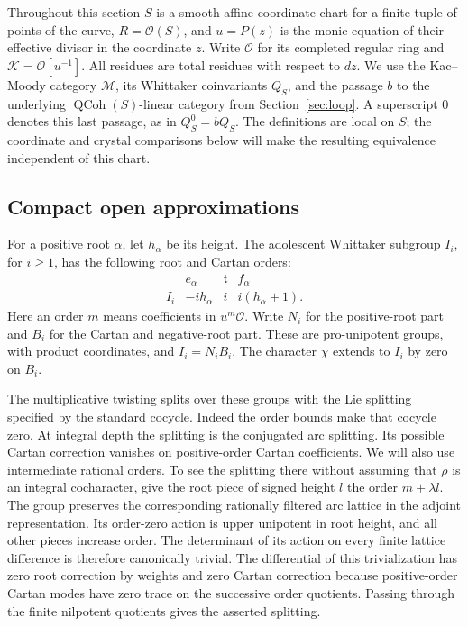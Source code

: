 \documentclass[11pt]{article}
\numberwithin{equation}{section}
\theoremstyle{definition}
\theoremstyle{remark}
\begin{document}
Throughout this section \(S\) is a smooth affine coordinate chart for a
finite tuple of points of the curve, \(R=\mathcal O(S)\), and \(u=P(z)\)
is the monic equation of their effective divisor in the coordinate
\(z\).  Write \(\mathcal O\) for its completed regular ring and
\(\mathcal K=\mathcal O[u^{-1}]\).  All residues are total residues with
respect to \(dz\).  We use the Kac--Moody category \(\mathcal M\), its
Whittaker coinvariants \(Q_S\), and the passage \(b\) to the underlying
\(\operatorname{QCoh}(S)\)-linear category from Section~\ref{sec:loop}.
A superscript \(0\) denotes this last passage, as in \(Q_S^0=bQ_S\).
The definitions are local on \(S\); the coordinate and crystal comparisons
below will make the resulting equivalence independent of this chart.

\subsection{Compact open approximations}

For a positive root \(\alpha\), let \(h_\alpha\) be its height.  The
adolescent Whittaker subgroup \(I_i\), for \(i\geq1\), has the following
root and Cartan orders:
\begin{equation}\label{eq:L4}
\begin{array}{c|ccc}
 &e_\alpha&\mathfrak t&f_\alpha\\ \hline
 I_i&-i h_\alpha&i&i(h_\alpha+1).
\end{array}
\end{equation}
Here an order \(m\) means coefficients in \(u^m\mathcal O\).
Write \(N_i\) for the positive-root part and \(B_i\) for the
Cartan and negative-root part.  These are pro-unipotent groups, with
product coordinates, and \(I_i=N_iB_i\).  The character \(\chi\)
extends to \(I_i\) by zero on \(B_i\).

The multiplicative twisting splits over these groups with the Lie
splitting specified by the standard cocycle.  Indeed the order bounds
make that cocycle zero.  At integral depth the splitting is the
conjugated arc splitting.  Its possible Cartan correction vanishes on
positive-order Cartan coefficients.  We will also use intermediate
rational orders.  To see the splitting there without assuming that
\(\rho\) is an integral cocharacter, give the root piece of signed height
\(l\) the order \(m+\lambda l\).  The group preserves the corresponding
rationally filtered arc lattice in the adjoint representation.  Its
order-zero action is upper unipotent in root height, and all other
pieces increase order.  The determinant of its action on every finite
lattice difference is therefore canonically trivial.  The differential
of this trivialization has zero root correction by weights and zero
Cartan correction because positive-order Cartan modes have zero trace
on the successive order quotients.  Passing through the finite
nilpotent quotients gives the asserted splitting.
\end{document}

